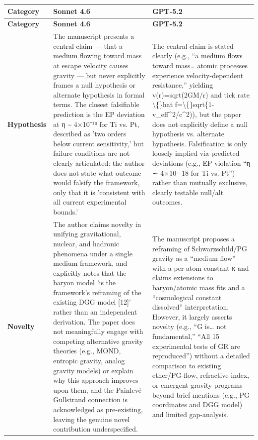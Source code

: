 \documentclass[11pt]{article}
\begin{document}
\begin{longtable}{@{} p{2.2cm} p{6.3cm} p{6.3cm} @{}}
\toprule
\textbf{Category} & \textbf{Sonnet 4.6} & \textbf{GPT-5.2} \\
\midrule
\endfirsthead
\toprule
\textbf{Category} & \textbf{Sonnet 4.6} & \textbf{GPT-5.2} \\
\midrule
\endhead
\bottomrule
\endlastfoot

\rowcolor{rowgray}
\textbf{Hypothesis} &
The manuscript presents a central claim — that a medium flowing toward mass at escape velocity causes gravity — but never explicitly frames a null hypothesis or alternate hypothesis in formal terms. The closest falsifiable prediction is the EP deviation at η \textasciitilde{} 4×10⁻¹⁸ for Ti vs. Pt, described as 'two orders below current sensitivity,' but failure conditions are not clearly articulated: the author does not state what outcome would falsify the framework, only that it is 'consistent with all current experimental bounds.' &
The central claim is stated clearly (e.g., “a medium flows toward mass… atomic processes experience velocity-dependent resistance,” yielding v(r)=sqrt(2GM/r) and tick rate \textbackslash\{\}hat f=\textbackslash\{\}sqrt\{1-v\_eff\textasciicircum{}2/c\textasciicircum{}2)), but the paper does not explicitly define a null hypothesis vs. alternate hypothesis. Falsification is only loosely implied via predicted deviations (e.g., EP violation “η ∼ 4×10−18 for Ti vs. Pt”) rather than mutually exclusive, clearly testable null/alt outcomes. \\[6pt]

\textbf{Novelty} &
The author claims novelty in unifying gravitational, nuclear, and hadronic phenomena under a single medium framework, and explicitly notes that the baryon model 'is the framework's reframing of the existing DGG model [12]' rather than an independent derivation. The paper does not meaningfully engage with competing alternative gravity theories (e.g., MOND, entropic gravity, analog gravity models) or explain why this approach improves upon them, and the Painlevé–Gullstrand connection is acknowledged as pre-existing, leaving the genuine novel contribution underspecified. &
The manuscript proposes a reframing of Schwarzschild/PG gravity as a “medium flow” with a per-atom constant κ and claims extensions to baryon/atomic mass fits and a “cosmological constant dissolved” interpretation. However, it largely asserts novelty (e.g., “G is… not fundamental,” “All 15 experimental tests of GR are reproduced”) without a detailed comparison to existing ether/PG-flow, refractive-index, or emergent-gravity programs beyond brief mentions (e.g., PG coordinates and DGG model) and limited gap-analysis. \\[6pt]


\end{longtable}
\end{document}
